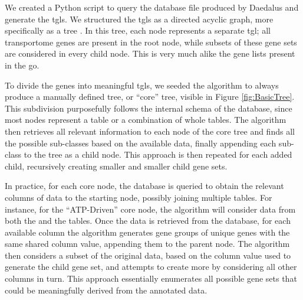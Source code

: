 We created a Python script to query the database file produced by Daedalus and
generate the \glspl{tgl}. We structured the \glspl{tgl} as a directed
acyclic graph, more specifically as a tree . In this tree, each node represents a
separate \gls{tgl}; all transportome genes are present in the root node, while
subsets of these gene sets are considered in every child node. This is very much
alike the gene lists present in the \gls{go}. %

To divide the genes into meaningful \glspl{tgl}, we seeded the algorithm to
always produce a manually defined tree, or ``core'' tree, visible in Figure
\ref{fig:BasicTree}. This subdivision purposefully follows the internal schema
of the database, since most nodes represent a table or a combination of whole
tables. The algorithm then retrieves all relevant information to each node of the
core tree and finds all the possible sub-classes based
on the available data, finally appending each sub-class to the tree as a child node.
This approach is then repeated for each added child, recursively
creating smaller and smaller child gene sets.

In practice, for each core node, the database is queried to obtain the
relevant columns of data to the starting node, possibly joining multiple tables. For instance, for the
``ATP-Driven'' core node, the algorithm will consider data from both the
 and the  tables. Once
the data is retrieved from the database, for each available column the algorithm
generates gene groups of unique genes with the same shared column value,
appending them to the parent node. The algorithm then considers a subset of the
original data, based on the column value used to generate the child gene set,
and attempts to create more by considering all other columns in turn. This
approach essentially enumerates all possible gene sets that could be
meaningfully derived from the annotated data.

